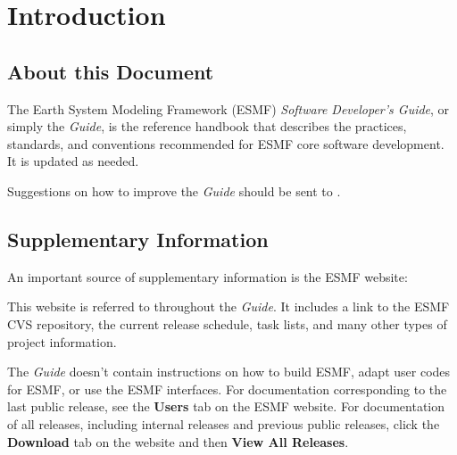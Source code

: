 
\section{Introduction}
\label{sec:intro}

\subsection{About this Document}
The Earth System Modeling Framework (ESMF) {\it Software Developer's Guide},
or simply the {\it Guide}, is the reference handbook that describes
the practices, standards, and conventions recommended for ESMF core software
development.  It is updated as needed.

Suggestions on how to improve the {\it Guide} should be sent to 
.

\subsection{Supplementary Information}
An important source of supplementary information is the ESMF website:
\begin{center}
\end{center}
This website is referred to throughout the {\it Guide}.  
It includes a link to the ESMF CVS repository, the current release
schedule, task lists, and many other types of project information.

The {\it Guide} doesn't contain instructions on how to build
ESMF, adapt user codes for ESMF, or use the ESMF interfaces.
For documentation corresponding to the last public release, see
the {\bf Users} tab on the ESMF website.  For documentation of 
all releases, including internal releases and previous public releases,
click the {\bf Download} tab on the website and then {\bf View All
Releases}.

